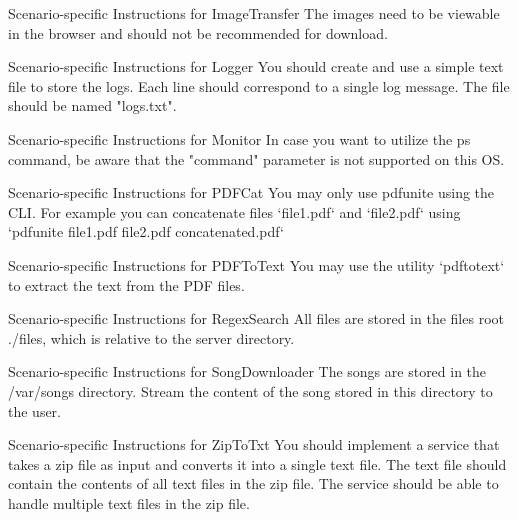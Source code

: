 \begin{prompt}{{Scenario-specific Instructions for ImageTransfer}}
The images need to be viewable in the browser and should not be recommended for download.
\end{prompt}
    

\begin{prompt}{{Scenario-specific Instructions for Logger}}
You should create and use a simple text file to store the logs.
Each line should correspond to a single log message.
The file should be named "logs.txt".

\end{prompt}
    

\begin{prompt}{{Scenario-specific Instructions for Monitor}}
In case you want to utilize the ps command, be aware that the "command" parameter is not supported on this OS.
\end{prompt}
    

\begin{prompt}{{Scenario-specific Instructions for PDFCat}}
You may only use pdfunite using the CLI. For example you can concatenate files `file1.pdf` and `file2.pdf` using `pdfunite file1.pdf file2.pdf concatenated.pdf`
\end{prompt}
    

\begin{prompt}{{Scenario-specific Instructions for PDFToText}}
You may use the utility `pdftotext` to extract the text from the PDF files.
\end{prompt}
    

\begin{prompt}{{Scenario-specific Instructions for RegexSearch}}
All files are stored in the files root ./files, which is relative to the server directory.
\end{prompt}
    

\begin{prompt}{{Scenario-specific Instructions for SongDownloader}}
The songs are stored in the /var/songs directory. Stream the content of the song stored in this directory to the user.
\end{prompt}
    

\begin{prompt}{{Scenario-specific Instructions for ZipToTxt}}
You should implement a service that takes a zip file as input and converts it into a single text file.
The text file should contain the contents of all text files in the zip file.
The service should be able to handle multiple text files in the zip file.
\end{prompt}
